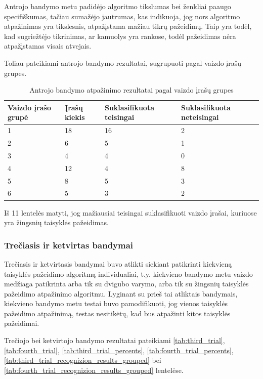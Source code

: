 \documentclass{VUMIFPSbakalaurinis}
\begin{document}
Antrojo bandymo metu padidėjo algoritmo tikslumas bei ženkliai paaugo specifiškumas, tačiau sumažėjo jautrumas, kas indikuoja, jog nors algoritmo atpažinimas yra tikslesnis, atpažįstama mažiau tikrų pažeidimų. Taip yra todėl, kad sugriežtėjo tikrinimas, ar kamuolys yra rankose, todėl pažeidimas nėra atpažįstamas visais atvejais. 

Toliau pateikiami antrojo bandymo rezultatai, sugrupuoti pagal vaizdo įrašų grupes.

\begin{table}[H]\footnotesize
	\centering
	\caption{Antrojo bandymo atpažinimo rezultatai pagal vaizdo įrašų grupes}
	{\begin{tabular}{|p{3cm}|p{3cm}|p{3cm}|p{3cm}|} \hline
			\textbf{Vaizdo įrašo grupė} & \textbf{Įrašų kiekis} & \textbf{Suklasifikuota teisingai} & \textbf{Suklasifikuota neteisingai} \\
			\hline
			1  & 18    & 16    & 2    \\
			\hline
			2  & 6    & 5  & 1     \\
			\hline
			3  & 4    & 4   & 0    \\
			\hline
			4  & 12    & 4  & 8     \\
			\hline
			5  & 8    & 5  & 3     \\
			\hline
			6  & 5    & 3  & 2     \\
			\hline
	\end{tabular}}
	\label{tab:recognizion_results_grouped}
\end{table}

Iš 11 lentelės matyti, jog mažiausiai teisingai suklasifikuoti vaizdo įrašai, kuriuose yra žingsnių taisyklės pažeidimas.  

\subsubsection{Trečiasis ir ketvirtas bandymai}

Trečiasis ir ketvirtasis bandymai buvo atlikti siekiant patikrinti kiekvieną taisyklės pažeidimo algoritmą individualiai, t.y. kiekvieno bandymo metu vaizdo medžiaga patikrinta arba tik su dvigubo varymo, arba tik su žingsnių taisyklės pažeidimo atpažinimo algoritmu. Lyginant su prieš tai atliktais bandymais, kiekvieno bandymo metu testai buvo pamodifikuoti, jog vienos taisyklės pažeidimo atpažinimą, testas nesitikėtų, kad bus atpažinti kitos taisyklės pažeidimai. 

Trečiojo bei ketvirtojo bandymo rezultatai pateikiami \ref{tab:third_trial}, \ref{tab:fourth_trial}, \ref{tab:third_trial_percents}, \ref{tab:fourth_trial_percents}, \ref{tab:third_trial_recognizion_results_grouped} bei \ref{tab:fourth_trial_recognizion_results_grouped} lentelėse. 
\end{document}
